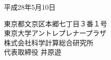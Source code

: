 \documentclass[11pt,a4paper]{jsarticle}
\begin{document}
\vspace{20pt}
\begin{flushright}
	平成28年5月10日\\
	\vspace{10pt}
	
	\vspace{10pt}
	東京都文京区本郷七丁目３番１号\\
	東京大学アントレプレナープラザ\\
	株式会社科学計算総合研究所\\
	代表取締役 井原遊
\end{flushright}
\end{document}
